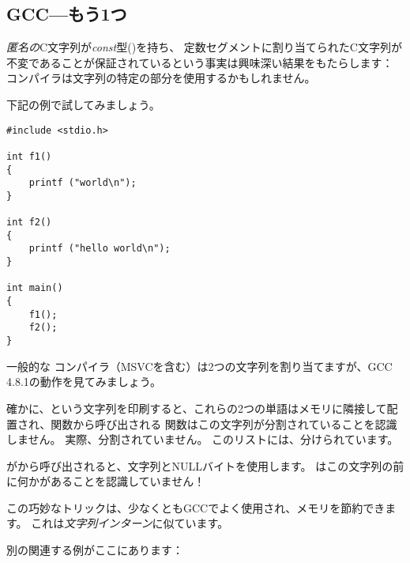 \subsection{GCC---もう1つ}
\label{use_parts_of_C_strings}

\emph{匿名の}C文字列が\emph{const}型()を持ち、
定数セグメントに割り当てられたC文字列が不変であることが保証されているという事実は興味深い結果をもたらします：
コンパイラは文字列の特定の部分を使用するかもしれません。

下記の例で試してみましょう。

\begin{lstlisting}[style=customc]
#include <stdio.h>

int f1()
{
	printf ("world\n");
}

int f2()
{
	printf ("hello world\n");
}

int main()
{
	f1();
	f2();
}
\end{lstlisting}

一般的な \CCpp{} コンパイラ（MSVCを含む）は2つの文字列を割り当てますが、GCC 4.8.1の動作を見てみましょう。



確かに、という文字列を印刷すると、これらの2つの単語はメモリに隣接して配置され、関数から呼び出される \puts 関数はこの文字列が分割されていることを認識しません。 
実際、分割されていません。 このリストには、分けられています。

\puts がから呼び出されると、文字列とNULLバイトを使用します。 \puts はこの文字列の前に何かがあることを認識していません！

この巧妙なトリックは、少なくともGCCでよく使用され、メモリを節約できます。 これは\emph{文字列インターン}に似ています。

別の関連する例がここにあります：
